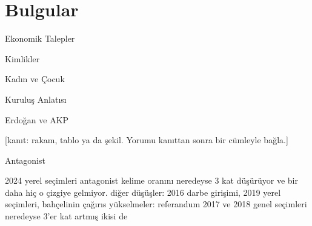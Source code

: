 \section{Bulgular}



\begin{bulgu}{Ekonomik Talepler}


    
\end{bulgu}

\begin{bulgu}{Kimlikler}

\end{bulgu}

\begin{bulgu}{Kadın ve Çocuk}
\end{bulgu}


\begin{bulgu}{Kuruluş Anlatısı}
\end{bulgu}


\begin{bulgu}{Erdoğan ve AKP}

[kanıt: rakam, tablo ya da şekil. Yorumu kanıttan sonra bir cümleyle bağla.]
\end{bulgu}

\begin{bulgu}{Antagonist} %

2024 yerel seçimleri antagonist kelime oranını neredeyse 3 kat düşürüyor ve bir daha hiç o çizgiye gelmiyor.
diğer düşüşler: 2016 darbe girişimi, 2019 yerel seçimleri, bahçelinin çağırıs
yükselmeler: referandum 2017 ve 2018 genel seçimleri neredeyse 3'er kat artmış ikisi de
\end{bulgu}
